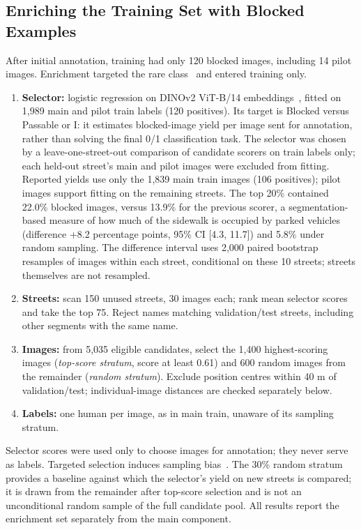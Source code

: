 \subsection{Enriching the Training Set with Blocked Examples}\label{en:enrich}
After initial annotation, training had only 120 blocked images, including 14 pilot images. Enrichment targeted the rare class~\cite{attenberg2010search} and entered training only.
\begin{enumerate}
\item \textbf{Selector:} logistic regression on DINOv2 ViT-B/14 embeddings~\cite{oquab2023dinov2}, fitted on 1,989 main and pilot train labels (120 positives). Its target is Blocked versus Passable or I: it estimates blocked-image yield per image sent for annotation, rather than solving the final 0/1 classification task. The selector was chosen by a leave-one-street-out comparison of candidate scorers on train labels only; each held-out street's main and pilot images were excluded from fitting. Reported yields use only the 1,839 main train images (106 positives); pilot images support fitting on the remaining streets. The top 20\% contained 22.0\% blocked images, versus 13.9\% for the previous scorer, a segmentation-based measure of how much of the sidewalk is occupied by parked vehicles (difference +8.2 percentage points, 95\% CI [4.3, 11.7]) and 5.8\% under random sampling. The difference interval uses 2,000 paired bootstrap resamples of images within each street, conditional on these 10 streets; streets themselves are not resampled.
\item \textbf{Streets:} scan 150 unused streets, 30 images each; rank mean selector scores and take the top 75. Reject names matching validation/test streets, including other segments with the same name.
\item \textbf{Images:} from 5,035 eligible candidates, select the 1,400 highest-scoring images (\emph{top-score stratum}, score at least 0.61) and 600 random images from the remainder (\emph{random stratum}). Exclude position centres within 40 m of validation/test; individual-image distances are checked separately below.
\item \textbf{Labels:} one human per image, as in main train, unaware of its sampling stratum.
\end{enumerate}
Selector scores were used only to choose images for annotation; they never serve as labels. Targeted selection induces sampling bias~\cite{farquhar2021bias}. The 30\% random stratum provides a baseline against which the selector's yield on new streets is compared; it is drawn from the remainder after top-score selection and is not an unconditional random sample of the full candidate pool. All results report the enrichment set separately from the main component.

